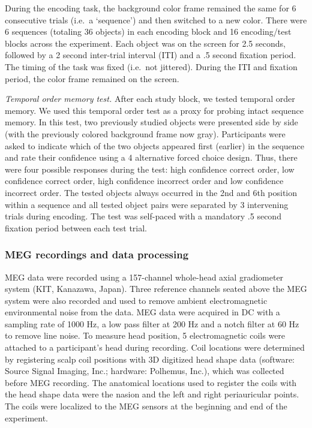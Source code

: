 During the encoding task, the background color frame remained the same
for 6 consecutive trials (i.e.~a `sequence') and then switched to a new
color. There were 6 sequences (totaling 36 objects) in each encoding
block and 16 encoding/test blocks across the experiment. Each object was
on the screen for 2.5 seconds, followed by a 2 second inter-trial
interval (ITI) and a .5 second fixation period. The timing of the task
was fixed (i.e.~not jittered). During the ITI and fixation period, the
color frame remained on the screen.

\emph{Temporal order memory test.} After each study block, we tested
temporal order memory. We used this temporal order test as a proxy for
probing intact sequence memory. In this test, two previously studied
objects were presented side by side (with the previously colored
background frame now gray). Participants were asked to indicate which of
the two objects appeared first (earlier) in the sequence and rate their
confidence using a 4 alternative forced choice design. Thus, there were
four possible responses during the test: high confidence correct order,
low confidence correct order, high confidence incorrect order and low
confidence incorrect order. The tested objects always occurred in the
2nd and 6th position within a sequence and all tested object pairs were
separated by 3 intervening trials during encoding. The test was
self-paced with a mandatory .5 second fixation period between each test
trial.

\subsubsection{MEG recordings and data
processing}\label{meg-recordings-and-data-processing}

MEG data were recorded using a 157-channel whole-head axial gradiometer
system (KIT, Kanazawa, Japan). Three reference channels seated above the
MEG system were also recorded and used to remove ambient electromagnetic
environmental noise from the data. MEG data were acquired in DC with a
sampling rate of 1000 Hz, a low pass filter at 200 Hz and a notch filter
at 60 Hz to remove line noise. To measure head position, 5
electromagnetic coils were attached to a participant's head during
recording. Coil locations were determined by registering scalp coil
positions with 3D digitized head shape data (software: Source Signal
Imaging, Inc.; hardware: Polhemus, Inc.), which was collected before MEG
recording. The anatomical locations used to register the coils with the
head shape data were the nasion and the left and right periauricular
points. The coils were localized to the MEG sensors at the beginning and
end of the experiment.

